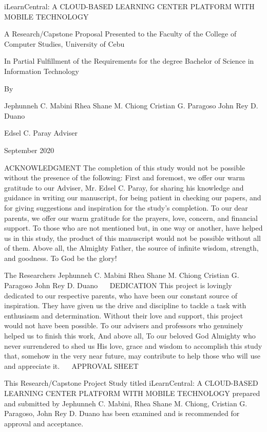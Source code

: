 iLearnCentral: A CLOUD-BASED LEARNING CENTER 
PLATFORM WITH MOBILE TECHNOLOGY




A Research/Capstone Proposal
Presented to the Faculty of the
College of Computer Studies, University of Cebu




In Partial Fulfillment of the Requirements
for the degree Bachelor of Science in Information Technology




By


Jephunneh C. Mabini
Rhea Shane M. Chiong
Cristian G. Paragoso
John Rey D. Duano


Edsel C. Paray
Adviser


September 2020 
 
 ACKNOWLEDGMENT
The completion of this study would not be possible without the presence of the following:
First and foremost, we offer our warm gratitude to our Adviser, Mr. Edsel C. Paray, for sharing his knowledge and guidance in writing our manuscript, for being patient in checking our papers, and for giving suggestions and inspiration for the study’s completion.
To our dear parents, we offer our warm gratitude for the prayers, love, concern, and financial support. 
To those who are not mentioned but, in one way or another, have helped us in this study, the product of this manuscript would not be possible without all of them.
Above all, the Almighty Father, the source of infinite wisdom, strength, and goodness. To God be the glory!

The Researchers
Jephunneh C. Mabini
Rhea Shane M. Chiong
Cristian G. Paragoso
John Rey D. Duano
 
DEDICATION
This project is lovingly dedicated to our respective parents, who have been our constant source of inspiration. They have given us the drive and discipline to tackle a task with enthusiasm and determination. Without their love and support, this project would not have been possible. 
To our advisers and professors who genuinely helped us to finish this work,
And above all,
To our beloved God Almighty who never surrendered to shed us His love, grace and wisdom to accomplish this study that, somehow in the very near future, may contribute to help those who will use and appreciate it.
 
APPROVAL SHEET

This Research/Capstone Project Study titled iLearnCentral: A CLOUD-BASED LEARNING CENTER PLATFORM WITH MOBILE TECHNOLOGY prepared and submitted by Jephunneh C. Mabini, Rhea Shane M. Chiong, Cristian G. Paragoso, John Rey D. Duano has been examined and is recommended for approval and acceptance.

